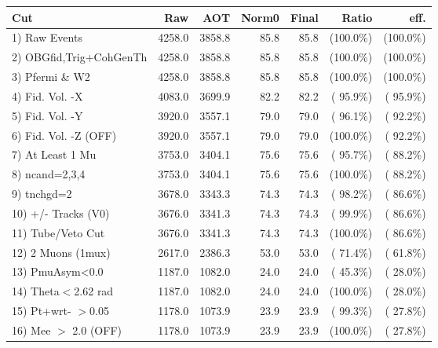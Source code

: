  \begin{table}[h!]\centering
 \begin{tabular}{||l||r|r|r|r|r|r||}
 \hline
 \hline
 Cut & Raw & AOT & Norm0 & Final & Ratio & eff.       \\
 \hline
  1) Raw Events           &       4258.0 &       3858.8 &         85.8 &         85.8 & (100.0\%) & (100.0\%) \\
  2) OBGfid,Trig+CohGenTh &       4258.0 &       3858.8 &         85.8 &         85.8 & (100.0\%) & (100.0\%) \\
  3) Pfermi \& W2         &       4258.0 &       3858.8 &         85.8 &         85.8 & (100.0\%) & (100.0\%) \\
  4) Fid. Vol. -X         &       4083.0 &       3699.9 &         82.2 &         82.2 & ( 95.9\%) & ( 95.9\%) \\
  5) Fid. Vol. -Y         &       3920.0 &       3557.1 &         79.0 &         79.0 & ( 96.1\%) & ( 92.2\%) \\
  6) Fid. Vol. -Z (OFF)   &       3920.0 &       3557.1 &         79.0 &         79.0 & (100.0\%) & ( 92.2\%) \\
  7) At Least 1 Mu        &       3753.0 &       3404.1 &         75.6 &         75.6 & ( 95.7\%) & ( 88.2\%) \\
  8) ncand=2,3,4          &       3753.0 &       3404.1 &         75.6 &         75.6 & (100.0\%) & ( 88.2\%) \\
  9) tnchgd=2             &       3678.0 &       3343.3 &         74.3 &         74.3 & ( 98.2\%) & ( 86.6\%) \\
 10) +/- Tracks (V0)      &       3676.0 &       3341.3 &         74.3 &         74.3 & ( 99.9\%) & ( 86.6\%) \\
 11) Tube/Veto Cut        &       3676.0 &       3341.3 &         74.3 &         74.3 & (100.0\%) & ( 86.6\%) \\
 12) 2 Muons (1mux)       &       2617.0 &       2386.3 &         53.0 &         53.0 & ( 71.4\%) & ( 61.8\%) \\
 13) PmuAsym<0.0          &       1187.0 &       1082.0 &         24.0 &         24.0 & ( 45.3\%) & ( 28.0\%) \\
 14) Theta$<$2.62 rad     &       1187.0 &       1082.0 &         24.0 &         24.0 & (100.0\%) & ( 28.0\%) \\
 15) Pt+wrt- $>$0.05      &       1178.0 &       1073.9 &         23.9 &         23.9 & ( 99.3\%) & ( 27.8\%) \\
 16) Mee $>$ 2.0  (OFF)   &       1178.0 &       1073.9 &         23.9 &         23.9 & (100.0\%) & ( 27.8\%) \\

\end{tabular}
\end{table}
